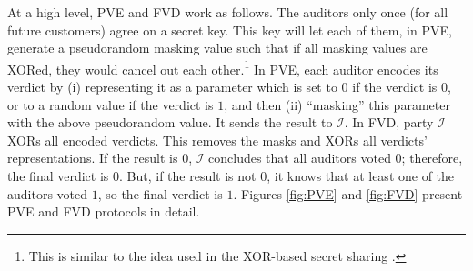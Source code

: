At a high level, PVE and FVD work as follows.  The auditors only once (for all future customers) agree on a secret key. This key will let each of them, in PVE,  generate a pseudorandom masking value such that if all masking values are XORed, they would cancel out each other.\footnote{This is similar to the idea used in the XOR-based secret sharing \cite{Schneier0078909}.} In PVE, each auditor encodes its verdict by (i) representing it as a parameter which is set to  $0$ if the verdict is $0$, or to a random value if the verdict is $1$, and then (ii) ``masking'' this parameter with the above pseudorandom value.  It sends the result to $\mathcal{I}$.  In FVD,  party $\mathcal{I}$   XORs all encoded verdicts. This removes the masks and XORs all verdicts' representations.  If the result is $0$,   $\mathcal{I}$ concludes that all auditors voted $0$; therefore,  the final verdict is $0$. But, if the result is not $0$,  it knows that at least one of the auditors voted $1$, so the final verdict is $1$. Figures \ref{fig:PVE} and \ref{fig:FVD} present  PVE and FVD protocols in detail.  





